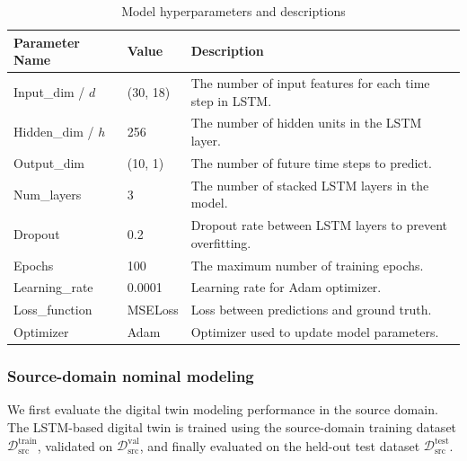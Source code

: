 \documentclass[a4paper,10pt]{cas-sc}%
\begin{document}
\begin{table}[htbp]
	\caption{Model hyperparameters and descriptions}
	\centering
	\label{tab:model_parameters}
	\begin{tabular}{@{}p{}p{}p{}@{}}
		\toprule
		\textbf{Parameter Name} & \textbf{Value} & \textbf{Description}                                     \\
		\midrule
		Input\_dim / \(d\)      & (30, 18)       & The number of input features for each time step in LSTM. \\
		Hidden\_dim / \(h\)     & 256            & The number of hidden units in the LSTM layer.            \\
		Output\_dim             & (10, 1)        & The number of future time steps to predict.              \\
		Num\_layers             & 3              & The number of stacked LSTM layers in the model.          \\
		Dropout                 & 0.2            & Dropout rate between LSTM layers to prevent overfitting. \\
		Epochs                  & 100            & The maximum number of training epochs.                   \\
		Learning\_rate          & 0.0001         & Learning rate for Adam optimizer.                        \\
		Loss\_function          & MSELoss        & Loss between predictions and ground truth.               \\
		Optimizer               & Adam           & Optimizer used to update model parameters.               \\
		\bottomrule
	\end{tabular}
\end{table}



\subsubsection{Source-domain nominal modeling}

We first evaluate the digital twin modeling performance in the source domain. The LSTM-based digital twin is trained using the source-domain training dataset \( \mathcal{D}_{\text{src}}^{\text{train}} \), validated on \( \mathcal{D}_{\text{src}}^{\text{val}} \), and finally evaluated on the held-out test dataset \( \mathcal{D}_{\text{src}}^{\text{test}} \).
\end{document}
